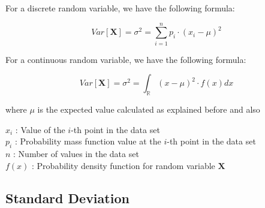 \documentclass{beamer}
\begin{document}
\begin{frame}

\justifying
For a discrete random variable, we have the following formula:

\begin{block}
\justifying
$$
Var[\mathbf{X}] = \sigma^{2} = \sum_{i=1}^{n} p_{i} \cdot \left(x_{i} - \mu \right)^{2}
$$
\end{block}

\vspace{0.2cm}
\justifying
For a continuous random variable, we have the following formula:

\begin{block}
\justifying
$$
Var[\mathbf{X}] = \sigma^{2} = \int_{\mathbb{R}} \left(x - \mu \right)^{2} \cdot f(x)dx
$$
\end{block}

\vspace{0.2cm}
\justifying
where $\mu$ is the expected value calculated as explained before and also

\vspace{0.2cm}
\justifying
$x_i$ : Value of the $i$-th point in the data set\\
$p_{i}$ :  Probability mass function value at the $i$-th point in the data set\\
$n$ : Number of values in the data set\\
$f(x)$ : Probability density function for random variable $\mathbf{X}$

\end{frame}






\subsection{Standard Deviation}
\end{document}
